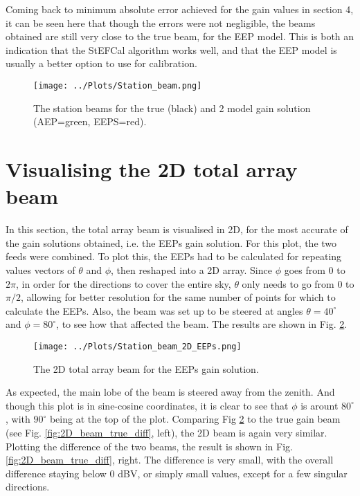 \documentclass[12pt]{report} %
\begin{document}
Coming back to minimum absolute error achieved for the gain values in section 4, it can be seen here that though the errors were not negligible, the beams obtained are still very close to the true beam, for the EEP model. This is both an indication that the StEFCal algorithm works well, and that the EEP model is usually a better option to use for calibration.


\begin{figure}[htbp]
  \centering
  \texttt{[image: ../Plots/Station\_beam.png]}
  \caption{The station beams for the true (black) and 2 model gain solution (AEP=green, EEPS=red). }
  \label{fig:station_beam_AEP}
\end{figure}



\section{Visualising the 2D total array beam}

In this section, the total array beam is visualised in 2D, for the most accurate of the gain solutions obtained, i.e. the EEPs gain solution. For this plot, the two feeds were combined. To plot this, the EEPs had to be calculated for repeating values vectors of $\theta$ and $\phi$, then reshaped into a 2D array. Since $\phi$ goes from $0$ to $2\pi$, in order for the directions to cover the entire sky, $\theta$ only needs to go from $0$ to $\pi/2$, allowing for better resolution for the same number of points for which to calculate the EEPs. Also, the beam was set up to be steered at angles $\theta = 40^{\circ}$ and $\phi = 80^{\circ}$, to see how that affected the beam. The results are shown in Fig. \ref{fig:2D_beam_EEP}.
\begin{figure}[h]
    \centering
    \texttt{[image: ../Plots/Station\_beam\_2D\_EEPs.png]}
    \caption{The 2D total array beam for the EEPs gain solution.}
    \label{fig:2D_beam_EEP}
\end{figure}

As expected, the main lobe of the beam is steered away from the zenith. And though this plot is in sine-cosine coordinates, it is clear to see that $\phi$ is arount $80^{\circ}$, with $90^{\circ}$ being at the top of the plot. Comparing Fig \ref{fig:2D_beam_EEP} to the true gain beam (see Fig. \ref{fig:2D_beam_true_diff}, left), the 2D beam is again very similar. Plotting the difference of the two beams, the result is shown in Fig. \ref{fig:2D_beam_true_diff}, right. The difference is very small, with the overall difference staying below $0$ dBV, or simply small values, except for a few singular directions.
\end{document}

